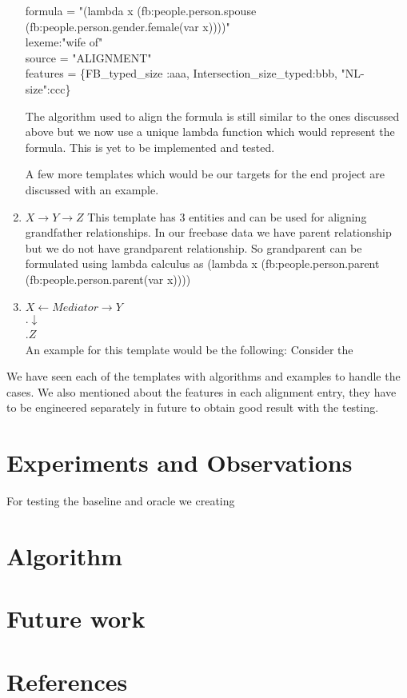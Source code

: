 \documentclass[12pt, a4paper]{article}
\begin{document}
\begin{enumerate}
formula = "(lambda x (fb:people.person.spouse (fb:people.person.gender.female(var x))))"\\
lexeme:"wife of"\\
source = "ALIGNMENT"\\
features = \{FB\_typed\_size :aaa, Intersection\_size\_typed:bbb, "NL-size":ccc\}

The algorithm used to align the formula is still similar to the ones discussed above but we now use a unique lambda function which would represent the formula. This is yet to be implemented and tested.

A few more templates which would be our targets for the end project are discussed with an example.

\item $X \rightarrow Y \rightarrow Z$
This template has 3 entities and can be used for aligning grandfather relationships. In our freebase data we have parent relationship but we do not have grandparent relationship. So grandparent can be formulated using lambda calculus as (lambda x (fb:people.person.parent (fb:people.person.parent(var x))))

\item $X\leftarrow Mediator \rightarrow Y$\\
.\qquad\qquad$\downarrow$\\
.\qquad\qquad$Z$\\
An example for this template would be the following: Consider the 
	
\end{enumerate}

We have seen each of the templates with algorithms and examples to handle the cases. We also mentioned about the features in each alignment entry, they have to be engineered separately in future to obtain good result with the testing. 

\section{Experiments and Observations}
For testing the baseline and oracle we creating

\section{Algorithm}




\section{Future work}

\section{References}
\end{document}
